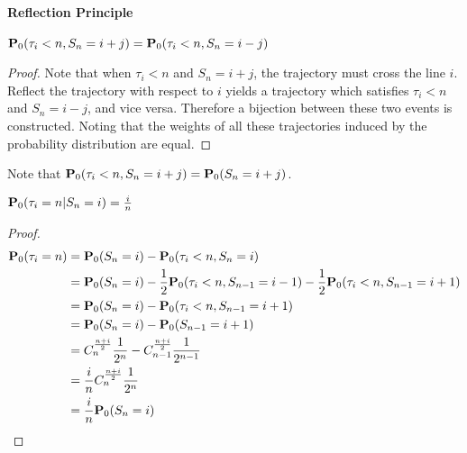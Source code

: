 \paragraph{Reflection Principle}
\begin{lemma}
$\mathbf{P}_0(\tau_i< n,S_n=i+j)=\mathbf{P}_0(\tau_i< n,S_n=i-j)$
\end{lemma}
\begin{proof}
    Note that when $\tau_i<n$ and $S_n=i+j$, the trajectory must cross the line $i$. 
    Reflect the trajectory with respect to $i$ yields a trajectory which satisfies $\tau_i<n$ and $S_n=i-j$, and vice versa.
    Therefore a bijection between these two events is constructed. 
    Noting that the weights of all these trajectories induced by the probability distribution are equal.
\end{proof}
\begin{remark}
    Note that $\mathbf{P}_0(\tau_i< n,S_n=i+j)=\mathbf{P}_0(S_n=i+j)$.
\end{remark}

\begin{theorem}
    $\mathbf{P}_0(\tau_i=n|S_n=i)=\frac{i}{n}$
\end{theorem}
\begin{proof}
    \begin{align*}
        \mathbf{P}_0(\tau_i=n)&=\mathbf{P}_0(S_n=i)-\mathbf{P}_0(\tau_i<n,S_n=i)\\
                    &=\mathbf{P}_0(S_n=i)-\frac{1}{2}\mathbf{P}_0(\tau_i<n,S_{n-1}=i-1)-\frac{1}{2}\mathbf{P}_0(\tau_i<n,S_{n-1}=i+1)\\
                    &=\mathbf{P}_0(S_n=i)-\mathbf{P}_0(\tau_i<n,S_{n-1}=i+1)\\
                    &=\mathbf{P}_0(S_n=i)-\mathbf{P}_0(S_{n-1}=i+1)\\
                    &=C_{n}^{\frac{n+i}{2}}\frac{1}{2^n}-C_{n-1}^{\frac{n+i}{2}}\frac{1}{2^{n-1}}\\
                    &=\frac{i}{n}C_{n}^{\frac{n+i}{2}}\frac{1}{2^n}\\
                    &=\frac{i}{n}\mathbf{P}_0(S_n=i)
    \end{align*}
\end{proof}

